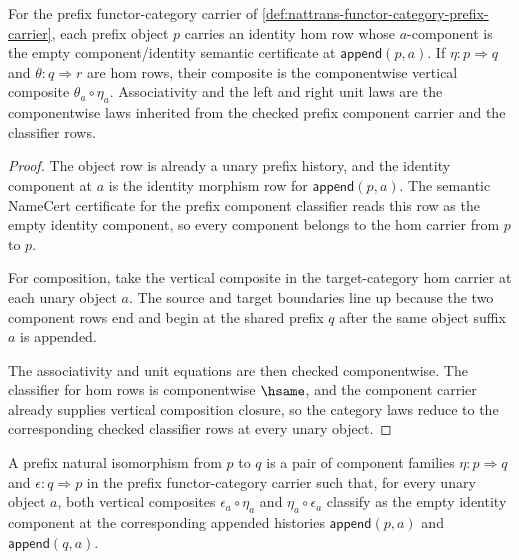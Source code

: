 \begin{theorem}
\label{thm:nattrans-functor-category-identity-and-composition}
For the prefix functor-category carrier of
\autoref{def:nattrans-functor-category-prefix-carrier}, each prefix object
$p$ carries an identity hom row whose $a$-component is the empty
component/identity semantic certificate at
$\mathsf{append}(p,a)$. If $\eta:p\Rightarrow q$ and $\theta:q\Rightarrow r$
are hom rows, their composite is the componentwise vertical composite
$\theta_a \circ \eta_a$. Associativity and the left and right unit laws are
the componentwise laws inherited from the checked prefix component carrier and
the classifier rows.
\end{theorem}
\begin{proof}
The object row is already a unary prefix history, and the identity component
at $a$ is the identity morphism row for
$\mathsf{append}(p,a)$. The semantic NameCert certificate for the prefix
component classifier reads this row as the empty identity component, so every
component belongs to the hom carrier from $p$ to $p$.

For composition, take the vertical composite in the target-category hom
carrier at each unary object $a$. The source and target boundaries line up
because the two component rows end and begin at the shared prefix
$q$ after the same object suffix $a$ is appended.

The associativity and unit equations are then checked componentwise. The
classifier for hom rows is componentwise $\hsame$, and the component carrier
already supplies vertical composition closure, so the category laws reduce to
the corresponding checked classifier rows at every unary object.
\end{proof}

\begin{definition}
\label{def:nattrans-prefix-natural-isomorphism-carrier}
A prefix natural isomorphism from $p$ to $q$ is a pair of component families
$\eta:p\Rightarrow q$ and $\epsilon:q\Rightarrow p$ in the prefix
functor-category carrier such that, for every unary object $a$, both vertical
composites $\epsilon_a \circ \eta_a$ and $\eta_a \circ \epsilon_a$ classify
as the empty identity component at the corresponding appended histories
$\mathsf{append}(p,a)$ and $\mathsf{append}(q,a)$.
\end{definition}


